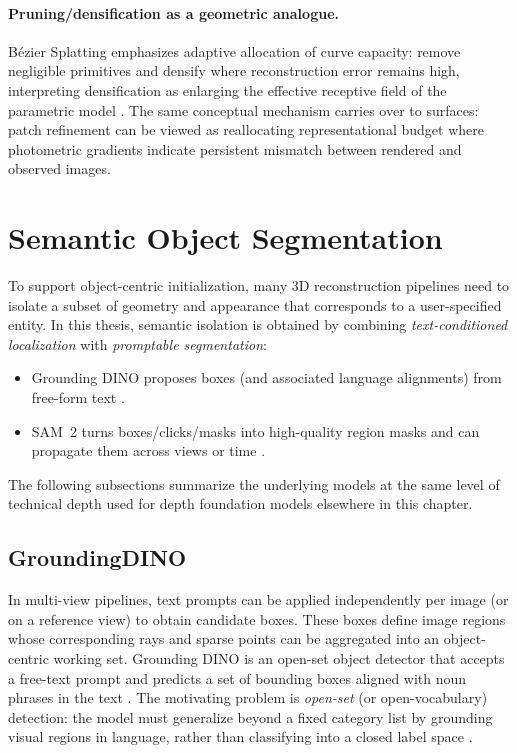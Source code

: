 \paragraph{Pruning/densification as a geometric analogue.}
B\'ezier Splatting emphasizes adaptive allocation of curve capacity: remove negligible primitives and densify where reconstruction error remains high, interpreting densification as enlarging the effective receptive field of the parametric model \cite{liu2025bezier}. The same conceptual mechanism carries over to surfaces: patch refinement can be viewed as reallocating representational budget where photometric gradients indicate persistent mismatch between rendered and observed images.

\section{Semantic Object Segmentation}
To support object-centric initialization, many 3D reconstruction pipelines need to isolate a subset of geometry and appearance that corresponds to a user-specified entity. In this thesis, semantic isolation is obtained by combining \emph{text-conditioned localization} with \emph{promptable segmentation}:
\begin{itemize}
    \item Grounding DINO proposes boxes (and associated language alignments) from free-form text \cite{liu2023groundingdino}.
    \item SAM~2 turns boxes/clicks/masks into high-quality region masks and can propagate them across views or time \cite{ravi2024sam2}.
\end{itemize}
The following subsections summarize the underlying models at the same level of technical depth used for depth foundation models elsewhere in this chapter.

\subsection{GroundingDINO}
In multi-view pipelines, text prompts can be applied independently per image (or on a reference view) to obtain candidate boxes. These boxes define image regions whose corresponding rays and sparse points can be aggregated into an object-centric working set. Grounding DINO is an open-set object detector that accepts a free-text prompt and predicts a set of bounding boxes aligned with noun phrases in the text \cite{liu2023groundingdino}. The motivating problem is \emph{open-set} (or open-vocabulary) detection: the model must generalize beyond a fixed category list by grounding visual regions in language, rather than classifying into a closed label space \cite{liu2023groundingdino}.

